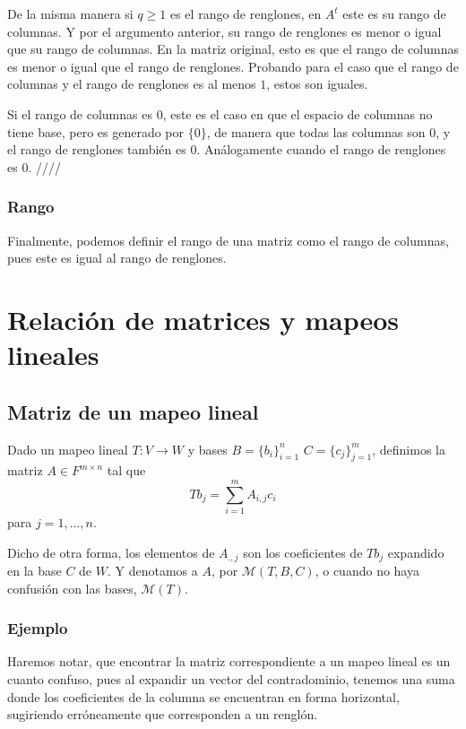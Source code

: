 \documentclass{article}
\begin{document}
De la misma manera si $q\geq 1$ es el rango de renglones, en $A^t$
este es su rango de columnas. Y por el argumento anterior, su
rango de renglones es menor o igual que su rango de columnas.
En la matriz original, esto es que el rango de columnas es menor
o igual que el rango de renglones. Probando para el caso que el rango 
de columnas y el rango de renglones es al menos $1$, estos son
iguales.

Si el rango de columnas es $0$, este es el caso en que el espacio de
columnas no tiene base, pero es generado por $\{0\}$, de manera que
todas las columnas son $0$, y el rango de renglones también es $0$. Análogamente cuando el rango de renglones es $0$.
\hfill ////

\subsubsection{Rango}
Finalmente, podemos definir el rango de una matriz como el rango de
columnas, pues este es igual al rango de renglones. 
\newpage

\section{Relación de matrices y mapeos lineales}
\subsection{Matriz de un mapeo lineal}
Dado un mapeo lineal $T: V\rightarrow W$ y bases $B=\{b_i\}^n_{i=1}$
$C=\{c_j\}^m_{j=1}$, definimos la matriz $A\in F^{m\times n}$ tal que
$$Tb_j = \sum^m_{i=1} A_{i,j} c_i$$
para $j=1,\ldots,n$.

\newcommand{\M}{\mathcal{M}}
Dicho de otra forma, los elementos de $A_{.,j}$ son los coeficientes
de $Tb_j$ expandido en la base $C$ de $W$. Y denotamos a $A$, por
$\mathcal{M}(T,B,C)$, o cuando no haya confusión con las bases,
$\mathcal{M}(T)$.

\subsubsection{Ejemplo}
Haremos notar, que encontrar la matriz correspondiente a un mapeo lineal
es un cuanto confuso, pues al expandir un vector del contradominio,
tenemos una suma donde los coeficientes de la columna se encuentran
en forma horizontal, sugiriendo erróneamente que corresponden a un
renglón.
\end{document}
